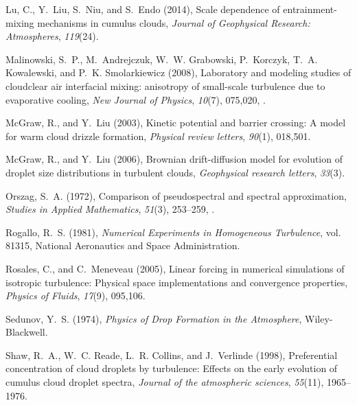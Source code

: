 \documentclass[draft,linenumbers]{AGUJournal}
\begin{document}
\begin{thebibliography}{60}
Lu, C., Y.~Liu, S.~Niu, and S.~Endo (2014), Scale dependence of
  entrainment-mixing mechanisms in cumulus clouds, \textit{Journal of
  Geophysical Research: Atmospheres}, \textit{119}(24).

Malinowski, S.~P., M.~Andrejczuk, W.~W. Grabowski, P.~Korczyk, T.~A.
  Kowalewski, and P.~K. Smolarkiewicz (2008), Laboratory and modeling studies
  of cloud{\textendash}clear air interfacial mixing: anisotropy of small-scale
  turbulence due to evaporative cooling, \textit{New Journal of Physics},
  \textit{10}(7), 075,020, .

McGraw, R., and Y.~Liu (2003), Kinetic potential and barrier crossing: A model
  for warm cloud drizzle formation, \textit{Physical review letters},
  \textit{90}(1), 018,501.

McGraw, R., and Y.~Liu (2006), Brownian drift-diffusion model for evolution of
  droplet size distributions in turbulent clouds, \textit{Geophysical research
  letters}, \textit{33}(3).

Orszag, S.~A. (1972), Comparison of pseudospectral and spectral approximation,
  \textit{Studies in Applied Mathematics}, \textit{51}(3), 253--259,
  .

Rogallo, R.~S. (1981), \textit{Numerical Experiments in Homogeneous
  Turbulence}, vol. 81315, National Aeronautics and Space Administration.

Rosales, C., and C.~Meneveau (2005), Linear forcing in numerical simulations of
  isotropic turbulence: Physical space implementations and convergence
  properties, \textit{Physics of Fluids}, \textit{17}(9), 095,106.

Sedunov, Y.~S. (1974), \textit{Physics of Drop Formation in the Atmosphere},
  Wiley-Blackwell.

Shaw, R.~A., W.~C. Reade, L.~R. Collins, and J.~Verlinde (1998), Preferential
  concentration of cloud droplets by turbulence: Effects on the early evolution
  of cumulus cloud droplet spectra, \textit{Journal of the atmospheric
  sciences}, \textit{55}(11), 1965--1976.


\end{thebibliography}
\end{document}
